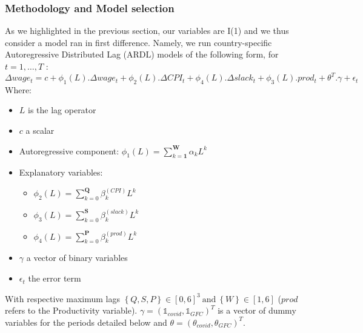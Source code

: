 \subsubsection{Methodology and Model selection}
\quad As we highlighted in the previous section, our variables are I(1) and we thus consider a model ran in first difference. 
Namely, we run country-specific Autoregressive Distributed Lag (ARDL) models of the following form, for $t=1,\ldots,T$ :
\begin{equation*}
    \Delta wage_{t} = c + \phi_{1}(L).\Delta wage_{t} + \phi_{2}(L).\Delta CPI_{t} + \phi_{4}(L).\Delta slack_{t} + \phi_{3}(L).prod_{t} + \theta^{T}.\gamma + \epsilon_{t}
  \end{equation*}
Where: \vspace{-.5cm}
\begin{itemize}
    \item $L$ is the lag operator \vspace{-.5cm}
    \item $c$ a scalar \vspace{-.5cm}
    \item Autoregressive component: $\phi_{1}(L) = \sum_{k=\mathbf{1}}^{\mathbf{W}}\alpha_k L^{k}$ \vspace{-.5cm}
    \item Explanatory variables: \vspace{-.5cm}
    \begin{itemize}
      \item $\phi_{2}(L) = \sum_{k=0}^{\mathbf{Q}}\beta_k^{(CPI)} L^{k}$ \vspace{-.3cm}
      \item $\phi_{3}(L) = \sum_{k=0}^{\mathbf{S}}\beta_k^{(slack)} L^{k}$ \vspace{-.3cm}
      \item $\phi_{4}(L) = \sum_{k=0}^{\mathbf{P}}\beta_k^{(prod)} L^{k}$ \vspace{-.3cm}
    \end{itemize}
    \item $\gamma$ a vector of binary variables \vspace{-.5cm}
    \item $\epsilon_{t}$ the error term
  \end{itemize} \vspace{-.3cm}
With respective maximum lags $\left\{Q,S,P\right\}\in\left[0,6\right]^{3}\ \textrm{and}\ \left\{W\right\}\in\left[1,6\right]$ ($prod$ refers to the Productivity variable).
$\gamma = (\mathbb{1}_{covid}, \mathbb{1}_{GFC})^{T}$ is a vector of dummy variables for the periods detailed below and $\theta = (\theta_{covid},\theta_{GFC})^{T}$.

